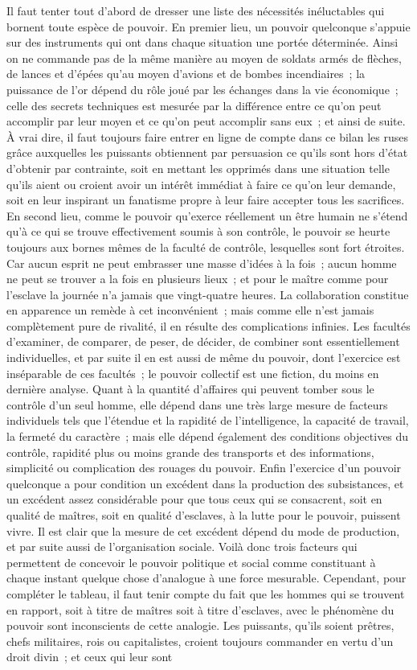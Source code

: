 \documentclass[french,twoside]{book} %
\begin{document}
Il faut tenter tout d'abord de dresser une liste des nécessités inéluctables qui bornent toute espèce de pouvoir. En premier lieu, un pouvoir quelconque s'appuie sur des instruments qui ont dans chaque situation une portée déterminée. Ainsi on ne commande pas de la même manière au moyen de soldats armés de flèches, de lances et d'épées qu'au moyen d'avions et de bombes incendiaires ; la puissance de l'or dépend du rôle joué par les échanges dans la vie économique ; celle des secrets techniques est mesurée par la différence entre ce qu'on peut accomplir par leur moyen et ce qu'on peut accomplir sans eux ; et ainsi de suite. À vrai dire, il faut toujours faire entrer en ligne de compte dans ce bilan les ruses grâce auxquelles les puissants obtiennent par persuasion ce qu'ils sont hors d'état d'obtenir par contrainte, soit en mettant les opprimés dans une situation telle qu'ils aient ou croient avoir un intérêt immédiat à faire ce qu'on leur demande, soit en leur inspirant un fanatisme propre à leur faire accepter tous les sacrifices. En second lieu, comme le pouvoir qu'exerce réellement un être humain ne s'étend qu'à ce qui se trouve effectivement soumis à son contrôle, le pouvoir se heurte toujours aux bornes mêmes de la faculté de contrôle, lesquelles sont fort étroites. Car aucun esprit ne peut embrasser une masse d'idées à la fois ; aucun homme ne peut se trouver a la fois en plusieurs lieux ; et pour le maître comme pour l'esclave la journée n'a jamais que vingt-quatre heures. La collaboration constitue en apparence un remède à cet inconvénient ; mais comme elle n'est jamais complètement pure de rivalité, il en résulte des complications infinies. Les facultés d'examiner, de comparer, de peser, de décider, de combiner sont essentiellement individuelles, et par suite il en est aussi de même du pouvoir, dont l'exercice est inséparable de ces facultés ; le pouvoir collectif est une fiction, du moins en dernière analyse. Quant à la quantité d'affaires qui peuvent tomber sous le contrôle d'un seul homme, elle dépend dans une très large mesure de facteurs individuels tels que l'étendue et la rapidité de l'intelligence, la capacité de travail, la fermeté du caractère ; mais elle dépend également des conditions objectives du contrôle, rapidité plus ou moins grande des transports et des informations, simplicité ou complication des rouages du pouvoir. Enfin l'exercice d'un pouvoir quelconque a pour condition un excédent dans la production des subsistances, et un excédent assez considérable pour que tous ceux qui se consacrent, soit en qualité de maîtres, soit en qualité d'esclaves, à la lutte pour le pouvoir, puissent vivre. Il est clair que la mesure de cet excédent dépend du mode de production, et par suite aussi de l’organisation sociale. Voilà donc trois facteurs qui permettent de concevoir le pouvoir politique et social comme constituant à chaque instant quelque chose d'analogue à une force mesurable. Cependant, pour compléter le tableau, il faut tenir compte du fait que les hommes qui se trouvent en rapport, soit à titre de maîtres soit à titre d'esclaves, avec le phénomène du pouvoir sont inconscients de cette analogie. Les puissants, qu'ils soient prêtres, chefs militaires, rois ou capitalistes, croient toujours commander en vertu d'un droit divin ; et ceux qui leur sont 
\end{document}
